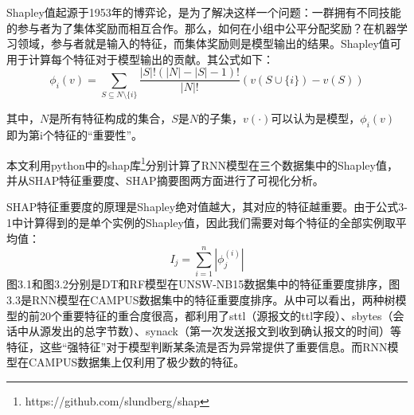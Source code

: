 

Shapley值起源于1953年的博弈论\cite{lundberg2018consistent}，是为了解决这样一个问题：一群拥有不同技能的参与者为了集体奖励而相互合作。那么，如何在小组中公平分配奖励？在机器学习领域，参与者就是输入的特征，而集体奖励则是模型输出的结果。Shapley值可用于计算每个特征对于模型输出的贡献。其公式如下： 
\begin{equation}
  \phi_i(v) = \sum_{S\subseteq N \setminus \{i\}} \frac{|S|! (|N| - |S| - 1)!}{|N|!}(v(S \cup \{i\}) - v(S))
\end{equation}

其中，$N$是所有特征构成的集合，$S$是$N$的子集，$v(\cdot)$可以认为是模型，$\phi_i(v)$ 即为第i个特征的“重要性”。

本文利用python中的shap库\footnote{https://github.com/slundberg/shap}分别计算了RNN模型在三个数据集中的Shapley值，并从SHAP特征重要度、SHAP摘要图两方面进行了可视化分析。

SHAP特征重要度的原理是Shapley绝对值越大，其对应的特征越重要。由于公式3-1中计算得到的是单个实例的Shapley值，因此我们需要对每个特征的全部实例取平均值：
\begin{equation}
  I_j = \sum_{i=1}^n |\phi_j^{(i)}|
\end{equation}
图3.1和图3.2分别是DT和RF模型在UNSW-NB15数据集中的特征重要度排序，图3.3是RNN模型在CAMPUS数据集中的特征重要度排序。从中可以看出，两种树模型的前20个重要特征的重合度很高，都利用了sttl（源报文的ttl字段）、sbytes（会话中从源发出的总字节数）、synack（第一次发送报文到收到确认报文的时间）等特征，这些“强特征”对于模型判断某条流是否为异常提供了重要信息。而RNN模型在CAMPUS数据集上仅利用了极少数的特征。




